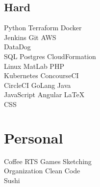 \documentclass[]{resume}
\begin{document}
\begin{minipage}[t]{0.3\textwidth}
\subsection{Hard}
Python \textbullet{} Terraform \textbullet{} Docker \\
Jenkins \textbullet{} Git \textbullet{} AWS \\ 
DataDog \\

\vspace{2mm}
SQL \textbullet{} Postgres \textbullet{} CloudFormation
\\ Linux \textbullet{} MatLab \textbullet{} PHP \\

\vspace{2mm}
Kubernetes \textbullet{} ConcourseCI \\
CircleCI  \textbullet{} GoLang \textbullet{} Java \\
JavaScript  \textbullet{} Angular \textbullet{} \LaTeX{} \\
CSS
\sectionsep


\section{Personal}
Coffee  \textbullet{} RTS Games  \textbullet{} Sketching \\ Organization  \textbullet{}  Clean Code \\ Sushi
\sectionsep



%
%

\end{minipage} 
\hfill
\end{document}
